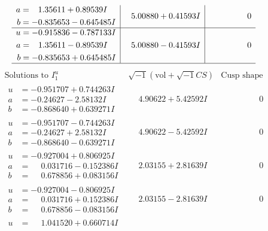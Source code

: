 \documentclass[1p]{elsarticle_modified}
\theoremstyle{definition}
\newcommand{\I}{\sqrt{-1}}
\begin{document}
$$\begin{array}{c|c|c}
\begin{aligned}
a &= \phantom{-}1.35611 + 0.89539 I \\
b &= -0.835653 - 0.645485 I\end{aligned}
 & \phantom{-}5.00880 + 0.41593 I & \phantom{-0.000000 } 0 \\ \hline\begin{aligned}
u &= -0.915836 - 0.787133 I \\
a &= \phantom{-}1.35611 - 0.89539 I \\
b &= -0.835653 + 0.645485 I\end{aligned}
 & \phantom{-}5.00880 - 0.41593 I & \phantom{-0.000000 } 0\\
 \hline 
 \end{array}$$\newpage$$\begin{array}{c|c|c}  
\text{Solutions to }I^u_{1}& \I (\text{vol} + \sqrt{-1}CS) & \text{Cusp shape}\\
 \hline 
\begin{aligned}
u &= -0.951707 + 0.744263 I \\
a &= -0.24627 - 2.58132 I \\
b &= -0.868640 + 0.639271 I\end{aligned}
 & \phantom{-}4.90622 + 5.42592 I & \phantom{-0.000000 } 0 \\ \hline\begin{aligned}
u &= -0.951707 - 0.744263 I \\
a &= -0.24627 + 2.58132 I \\
b &= -0.868640 - 0.639271 I\end{aligned}
 & \phantom{-}4.90622 - 5.42592 I & \phantom{-0.000000 } 0 \\ \hline\begin{aligned}
u &= -0.927004 + 0.806925 I \\
a &= \phantom{-}0.031716 - 0.152386 I \\
b &= \phantom{-}0.678856 + 0.083156 I\end{aligned}
 & \phantom{-}2.03155 + 2.81639 I & \phantom{-0.000000 } 0 \\ \hline\begin{aligned}
u &= -0.927004 - 0.806925 I \\
a &= \phantom{-}0.031716 + 0.152386 I \\
b &= \phantom{-}0.678856 - 0.083156 I\end{aligned}
 & \phantom{-}2.03155 - 2.81639 I & \phantom{-0.000000 } 0 \\ \hline\begin{aligned}
u &= \phantom{-}1.041520 + 0.660714 I \\

\end{aligned}
\end{array}$$
\end{document}
